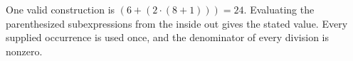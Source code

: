 One valid construction is $\boxed{(6+(2\cdot (8+1)))=24}$. Evaluating the parenthesized subexpressions from the inside out gives the stated value. Every supplied occurrence is used once, and the denominator of every division is nonzero.
